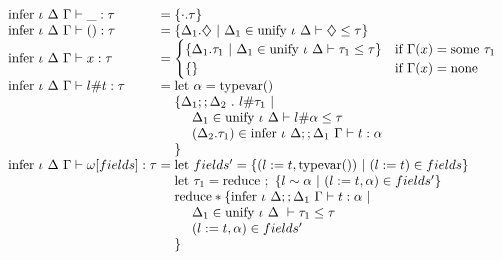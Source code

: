 \documentclass[sigplan,screen]{acmart}
\begin{document}
\begin{figure*}[h]
  \[
    \begin{array}{l @{} l}
      \text{infer } \iota\ \Delta\ \Gamma \vdash 
      \_ : \tau
      &{} =
      \{\cdot.\tau\}
      \\

      \text{infer } \iota\ \Delta\ \Gamma \vdash 
      () : \tau
      &{} =
      \begin{array}[t]{@{} l}
        \{\Delta_1.\diamondsuit\ |
        \ \Delta_1 \in \text{unify } \iota\ \Delta \vdash \diamondsuit \leq \tau
        \}
      \end{array}
      \\

      \text{infer } \iota\ \Delta\ \Gamma \vdash 
      x : \tau
      &{} =
      \begin{cases}  
        \{\Delta_1.\tau_1\ |
        \ \Delta_1 \in \text{unify } \iota\ \Delta \vdash \tau_1 \leq \tau
        \}
        &\text{if } \Gamma(x) = \text{some } \tau_1
        \\
        \{\}
        &\text{if } \Gamma(x) = \text{none}
      \end{cases}
      \\

      \text{infer } \iota\ \Delta\ \Gamma \vdash 
      l \# t : \tau
      &{} =
      \begin{array}[t]{@{} l}
        \text{let } \alpha = \text{typevar}() 
        \\
        \{\Delta_1;;\Delta_2\ .\ l \# \tau_1 \ |
        \\
        \ \ \ \ \Delta_1 \in \text{unify } \iota\ \Delta \vdash l \# \alpha \leq \tau
        \\
        \ \ \ \ (\Delta_2.\tau_1) \in \text{infer } \iota\ \Delta;;\Delta_1\ \Gamma \vdash t : \alpha
        \\
        \}
      \end{array}
      \\

      \text{infer } \iota\ \Delta\ \Gamma \vdash 
      \omega[ fields ] : \tau
      &{} =
      \begin{array}[t]{@{} l}
        \text{let } fields' = \{(l:=t, \text{typevar}())\ |\ (l:=t) \in fields \}
        \\
        \text{let } \tau_1 = \text{reduce } ;\ \{l \sim \alpha\ |\ (l := t, \alpha) \in fields' \}
        \\


        \text{reduce} * \{
        \text{infer } \iota\ \Delta;;\Delta_1\ \Gamma \vdash t : \alpha\ |\ 
        \\
        \ \ \ \ \Delta_1 \in \text{unify } \iota\ \Delta\ \vdash \tau_1 \leq \tau
        \\
        \ \ \ \ (l := t, \alpha) \in fields'
        \\
        \}
        \\
      \end{array}
      \\


\end{array}\]
\end{figure*}
\end{document}
